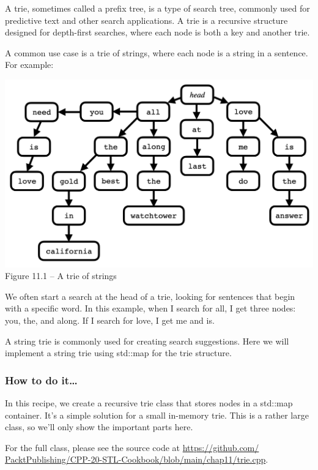 
A trie, sometimes called a prefix tree, is a type of search tree, commonly used for predictive text and other search applications. A trie is a recursive structure designed for depth-first searches, where each node is both a key and another trie.

A common use case is a trie of strings, where each node is a string in a sentence. For example:

\begin{center}
\includegraphics[width=1.0\textwidth]{content/chapter11/images/1.png}\\
Figure 11.1 – A trie of strings
\end{center}

We often start a search at the head of a trie, looking for sentences that begin with a specific word. In this example, when I search for all, I get three nodes: you, the, and along.
If I search for love, I get me and is.

A string trie is commonly used for creating search suggestions. Here we will implement a string trie using std::map for the trie structure.

\subsubsection{How to do it…}

In this recipe, we create a recursive trie class that stores nodes in a std::map container. It's a simple solution for a small in-memory trie. This is a rather large class, so we'll only show the important parts here.

For the full class, please see the source code at \url{https://github.com/ PacktPublishing/CPP-20-STL-Cookbook/blob/main/chap11/trie.cpp}.

